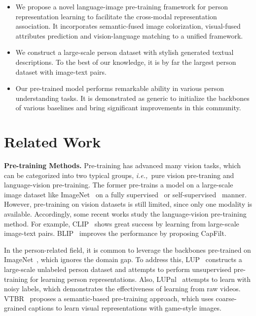 \documentclass[10pt,twocolumn,letterpaper]{article}
\def\ie{{\it{i.e.,~}}}
\begin{document}
\begin{itemize}[leftmargin=*,itemsep=2pt,topsep=0pt,parsep=0pt]
\item
 We propose a novel language-image pre-training framework for person representation learning to facilitate the cross-modal representation association. It incorporates semantic-fused image colorization, visual-fused attributes prediction and vision-language matching to a unified framework. 
 \item
 We construct a large-scale person dataset with stylish generated textual descriptions. To the best of our knowledge, it is by far the largest person dataset with image-text pairs.
 \item
 Our pre-trained model performs remarkable ability in various person understanding tasks. It is demonstrated as generic to initialize the backbones of various baselines and bring significant improvements in this community.
\end{itemize}
\section{Related Work}
\noindent
\textbf{Pre-training Methods.}
Pre-training has advanced many vision tasks, which can be categorized into two typical groups, \ie pure vision pre-traning and language-vision pre-training. The former pre-trains a model on a large-scale image dataset like ImageNet~\cite{imagenet} on a fully supervised~\cite{resnet} or self-supervised~\cite{UFLNI,mocov1,mocov2} manner.
However, pre-training on vision datasets is still limited, since only one modality is available. Accordingly, some recent works study the language-vision pre-training method. For example, CLIP~\cite{CLIP} shows great success by learning from large-scale image-text pairs.
BLIP~\cite{BLIP} improves the performance by proposing CapFilt. 

In the person-related field, it is common to leverage the backbones pre-trained on ImageNet~\cite{SSG,UMD,HC}, which ignores the domain gap. To address this, LUP~\cite{LUP} constructs a large-scale unlabeled person dataset and attempts to perform unsupervised pre-training for learning person representations. Also, LUPnl~\cite{LUPnl} attempts to learn with noisy labels, which demonstrates the effectiveness of learning from raw videos. VTBR~\cite{VTBR} proposes a semantic-based pre-training approach, which uses coarse-grained captions to learn visual representations with game-style images.
 
\end{document}
